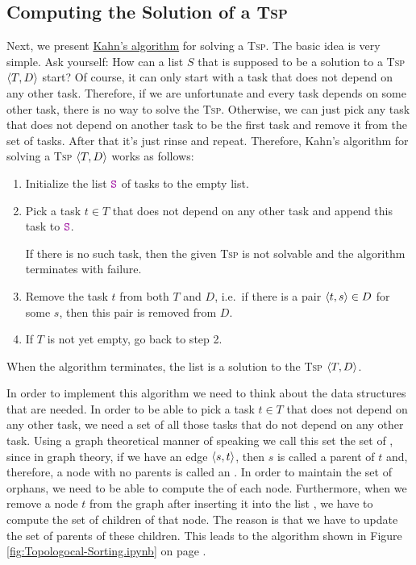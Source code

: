 \subsection{Computing the Solution of a \textsc{Tsp}}
Next, we present \href{https://en.wikipedia.org/wiki/Topological_sorting}{Kahn's algorithm} \cite{kahn:1962} for solving a \textsc{Tsp}.
The basic idea is very simple. Ask yourself:  How can a list $S$ that is supposed to be a solution to a
\textsc{Tsp} $\pair(T, D)$ start? 
Of course, it can only start with a task that does not depend on any other task.  Therefore, if we are
unfortunate and every task depends on some other task, there is no way to solve the \textsc{Tsp}.  Otherwise,
we can just pick any task that does not depend on another task to be the first task and remove it from the set
of tasks.  After that it's just rinse and repeat.  Therefore, Kahn's algorithm for solving a \textsc{Tsp}
$\pair(T, D)$ works as follows: 
\begin{enumerate}
\item Initialize the list $\mytt{S}$ of tasks to the empty list.
\item Pick a task $t \in T$ that does not depend on any other task and append this task to $\mytt{S}$.

      If there is no such task, then the given \textsc{Tsp} is not solvable and the algorithm terminates with failure.
\item Remove the task $t$ from both $T$ and $D$, i.e.~if there is a pair $\pair(t, s) \in D$ for some $s$, then
      this pair is removed from $D$.
\item If $T$ is not yet empty, go back to step 2.  
\end{enumerate}
When the algorithm terminates, the list  is a solution to the \textsc{Tsp} $\pair(T, D)$.

In order to implement this algorithm we need to think about the data structures that are needed.
In order to be able to pick a task $t \in T$ that does not depend on any other task, we need a set of all those
tasks that do not depend on any other task.  Using a graph theoretical manner of speaking we call this set the
set of , since in graph theory, if we have an edge $\pair(s, t)$, then $s$ is called a parent of
$t$ and, therefore, a node with no parents is called an .  In order to maintain the set of
orphans, we need to be able to compute the  of each node.  Furthermore, when we remove a node $t$
from the graph after inserting it into the list , we have to compute the set of children of that
node.  The reason is that we have to update the set of parents of these children.  This leads to the algorithm
shown in Figure \ref{fig:Topologocal-Sorting.ipynb} on page \pageref{fig:Topologocal-Sorting.ipynb}.

